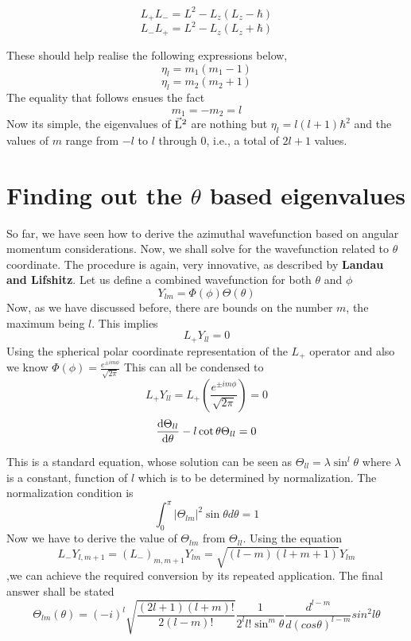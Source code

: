 \documentclass[12pt]{article}
\begin{document}
$$L_+L_- = L^2 - L_z(L_z - \hbar)$$
$$L_-L_+ = L^2 - L_z(L_z +\hbar)$$

These should help realise the following expressions below,
$$\eta_l = m_1(m_1-1)$$
$$\eta_l = m_2(m_2+1)$$
The equality that follows ensues the fact $$m_1 = -m_2 = l$$ Now its simple, the eigenvalues of \textbf{$\vec{\mathrm{L}}^2$} are nothing but $\eta_l = l(l+1)\hbar^2$ and the values of $m$ range from $-l$ to $l$ through 0, i.e., a total of $2l+1$ values.

\section{Finding out the $\theta$ based eigenvalues}
So far, we have seen how to derive the azimuthal wavefunction based on angular momentum considerations. Now, we shall solve for the wavefunction related to $\theta$ coordinate. The procedure is again, very innovative, as described by \textbf{Landau and Lifshitz}. Let us define a combined wavefunction for both $\theta$ and $\phi$ $$Y_{lm} = \Phi(\phi)\Theta(\theta)$$ Now, as we have discussed before, there are bounds on the number $m$, the maximum being $l$. This implies $$L_+Y_{ll} = 0$$ Using the spherical polar coordinate representation of the $L_+$ operator and also we know $\Phi(\phi) = \frac{e^{\pm im\phi}}{\sqrt {2\pi}}$ This can all be condensed to 
$$L_+Y_{ll} = L_+(\frac{e^{\pm im\phi}}{\sqrt {2\pi}}) = 0$$
$$\frac{\mathrm{d}{\Theta_{ll}}}{\mathrm{d}{\theta}} - l\cot{\theta}\Theta_{ll} = 0$$

This is a standard equation, whose solution can be seen as $\Theta_{ll} = \lambda\sin^l\theta$ where $\lambda$ is a constant, function of $l$ which is to be determined by normalization. The normalization condition is 
$$\int_0^\pi |\Theta_{lm}|^2\sin\theta d\theta = 1$$
Now we have to derive the value of $\Theta_{lm}$ from $\Theta_{ll}$. Using the equation $$L_-Y_{l,m+1} = (L_-)_{m,m+1}Y_{lm} = \sqrt{(l-m)(l+m+1)}Y_{lm}$$,we can achieve the required conversion by its repeated application.
The final answer shall be stated
$$\Theta_{lm}(\theta) = (-i)^l\sqrt{\frac{(2l+1)(l+m)!}{2(l-m)!}}\frac{1}{2^ll!\sin^m\theta}\frac{d^{l-m}}{d(cos\theta)^{l-m}}sin^2l\theta$$
\end{document}
